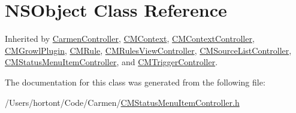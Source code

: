 \hypertarget{class_n_s_object}{
\section{NSObject Class Reference}
\label{class_n_s_object}
}
Inherited by \hyperlink{interface_carmen_controller}{CarmenController}, \hyperlink{interface_c_m_context}{CMContext}, \hyperlink{interface_c_m_context_controller}{CMContextController}, \hyperlink{interface_c_m_growl_plugin}{CMGrowlPlugin}, \hyperlink{interface_c_m_rule}{CMRule}, \hyperlink{interface_c_m_rules_view_controller}{CMRulesViewController}, \hyperlink{interface_c_m_source_list_controller}{CMSourceListController}, \hyperlink{interface_c_m_status_menu_item_controller}{CMStatusMenuItemController}, and \hyperlink{interface_c_m_trigger_controller}{CMTriggerController}.



The documentation for this class was generated from the following file:\begin{CompactItemize}
\item 
/Users/hortont/Code/Carmen/\hyperlink{_c_m_status_menu_item_controller_8h}{CMStatusMenuItemController.h}\end{CompactItemize}
